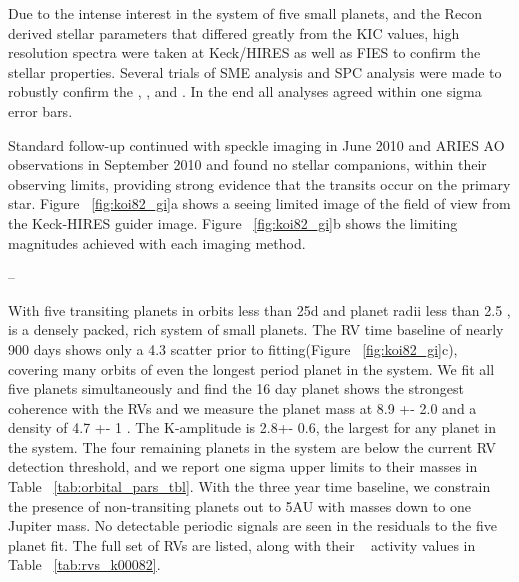 \documentclass{emulateapj}
\begin{document}
Due to the intense interest in the system of five small planets, and the Recon derived
stellar parameters that differed greatly from the KIC values, high resolution 
spectra were taken at Keck/HIRES as well as FIES to confirm the stellar properties. 
Several trials of SME analysis and SPC analysis were made to robustly confirm 
the \teff, \logg, and \feh. In the end all analyses agreed within one sigma error 
bars. 

 Standard  follow-up continued with  speckle imaging in June 2010 and ARIES AO observations in 
 September 2010 and found no stellar companions, within their observing limits, providing strong
 evidence that the transits occur on the primary star. Figure ~\ref{fig:koi82_gi}a shows a seeing limited
 image of the field of view from the Keck-HIRES guider image.   Figure  ~\ref{fig:koi82_gi}b shows the 
 limiting magnitudes achieved with each imaging method.  

--

With five transiting planets in orbits less than 25d and planet radii less 
than 2.5 \rearth, {\koieighttwo} is a densely packed, rich  system of small planets. 
The RV time baseline of nearly 900 days shows only a 4.3 \ms scatter prior to 
fitting(Figure ~\ref{fig:koi82_gi}c), covering many orbits of even the longest 
period planet in the system. We fit all five planets simultaneously and find the 16 day planet shows the strongest coherence
 with the RVs and we measure  the planet mass at 8.9 +- 2.0 \mearth and a density of 
 4.7 +- 1 \gcc. The K-amplitude is 2.8+- 0.6\ms, the largest for any planet in the system.
 The four remaining planets in the system are below the current 
 RV detection threshold, and  we report one sigma upper limits to their masses in 
 Table ~\ref{tab:orbital_pars_tbl}. With the three year time baseline, we  constrain the presence of non-transiting planets out to 5AU with masses down to one Jupiter mass. No detectable periodic signals are
 seen in the residuals to the five planet fit.
The full set of RVs are listed, along with their \rphk~ activity values in Table ~\ref{tab:rvs_k00082}.





\end{document}

